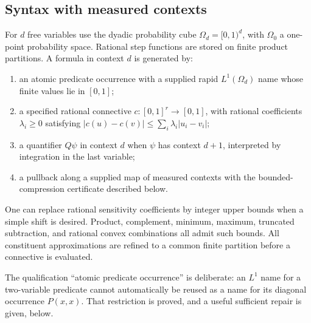 \subsection{Syntax with measured contexts}

For $d$ free variables use the dyadic probability cube
$\Omega_d=[0,1)^d$, with $\Omega_0$ a one-point probability space. Rational
step functions are stored on finite product partitions. A formula in
context $d$ is generated by:
\begin{enumerate}
\item an atomic predicate occurrence with a supplied rapid $L^1(\Omega_d)$
name whose finite values lie in $[0,1]$;
\item a specified rational connective $c:[0,1]^r\to[0,1]$, with rational
coefficients $\lambda_i\geq0$ satisfying
$|c(u)-c(v)|\leq\sum_i\lambda_i|u_i-v_i|$;
\item a quantifier $Q\psi$ in context $d$ when $\psi$ has context $d+1$,
interpreted by integration in the last variable;
\item a pullback along a supplied map of measured contexts with the
bounded-compression certificate described below.
\end{enumerate}
One can replace rational sensitivity coefficients by integer upper bounds
when a simple shift is desired. Product, complement, minimum, maximum,
truncated subtraction, and rational convex combinations all admit such
bounds. All constituent approximations are refined to a common finite
partition before a connective is evaluated.

The qualification ``atomic predicate occurrence'' is deliberate: an
$L^1$ name for a two-variable predicate cannot automatically be reused as
a name for its diagonal occurrence $P(x,x)$. That restriction is proved,
and a useful sufficient repair is given, below.

